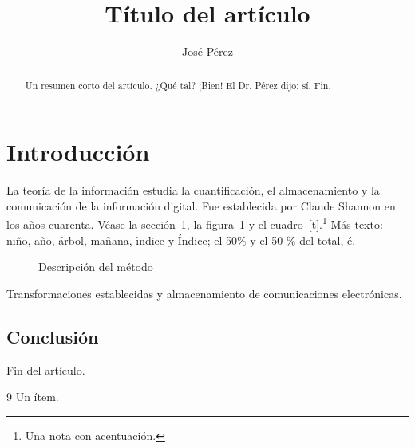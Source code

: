 \documentclass{article}
\title{Título del artículo}
\author{José Pérez}
\begin{document}
\maketitle
\begin{abstract}
Un resumen corto del artículo. ¿Qué tal? ¡Bien! El Dr. Pérez dijo: sí. Fin.
\end{abstract}
\tableofcontents
\section{Introducción}\label{s}
La teoría de la información estudia la cuantificación, el almacenamiento y la comunicación de la
información digital. Fue establecida por Claude Shannon en los años cuarenta. Véase la
sección~\ref{s}, la figura~\ref{f} y el cuadro~\ref{t}.\footnote{Una nota con acentuación.} Más texto:
niño, año, \'arbol, ma\~nana, \'{\i}ndice y \'{I}ndice; el 50\% y el 50 \% del total, \'e.
\begin{figure}[h]
\caption{Descripción del método}\label{f}
\end{figure}
\begin{table}[h]
\caption{Resultados numéricos}\label{t}
\end{table}
\begin{minipage}{60pt}
Transformaciones establecidas y almacenamiento de comunicaciones electrónicas.
\end{minipage}
\subsection{Conclusión}
Fin del artículo.
\begin{thebibliography}{9}
 Un ítem.
\end{thebibliography}
\end{document}
